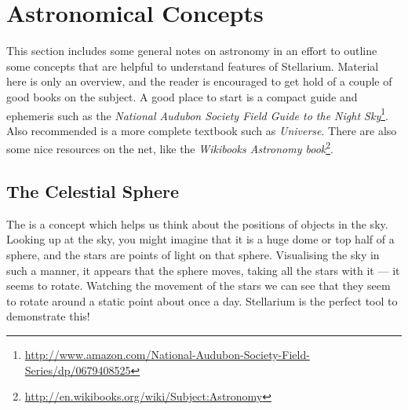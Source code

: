
\chapter{Astronomical Concepts}
\label{ch:Concepts}

This section includes some general notes on astronomy in an effort to
outline some concepts that are helpful to understand features of
Stellarium. Material here is only an overview, and the reader is
encouraged to get hold of a couple of good books on the subject. A good
place to start is a compact guide and ephemeris such as the
\emph{National Audubon Society Field Guide to the Night Sky}\footnote{\url{http://www.amazon.com/National-Audubon-Society-Field-Series/dp/0679408525}}. Also recommended is a
more complete textbook such as \emph{Universe}. %
There are also some nice resources on the net, like the
\emph{Wikibooks Astronomy book}\footnote{\url{http://en.wikibooks.org/wiki/Subject:Astronomy}}.

\section{The Celestial Sphere}
\label{sec:Concepts:CelestialSphere}

The  is a concept which helps us think about the
positions of objects in the sky. Looking up at the sky, you might
imagine that it is a huge dome or top half of a sphere, and the stars
are points of light on that sphere. Visualising the sky in such a
manner, it appears that the sphere moves, taking all the stars with it
--- it seems to rotate. Watching the movement of the stars we can see
that they seem to rotate around a static point about once a day.
Stellarium is the perfect tool to demonstrate this!

